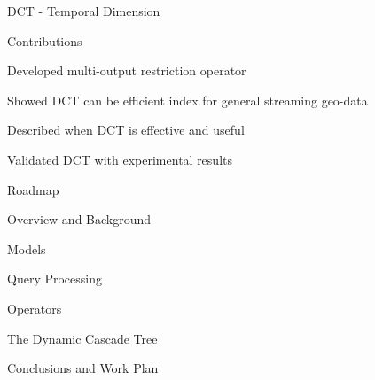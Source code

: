 \documentclass[final,total,bgColor,slideColor,pdf,ps2pdf,default,noaccumulate]{prosper}
\begin{document}
\begin{slide}{DCT - Temporal Dimension}
  \centering
  \scalebox{0.8}{}
\end{slide}

\begin{slide}{Contributions}
  \begin{Itemize}
  \item Developed multi-output restriction operator    
  \item Showed DCT can be efficient index for general streaming geo-data
  \item Described when DCT is effective and useful
  \item Validated DCT with experimental results
  \end{Itemize}
\end{slide}

\begin{slide}{Roadmap}
  \begin{Itemize}
    {\tiny
    \item Overview and Background
    \item Models
    \item Query Processing
    \item Operators
    \item The Dynamic Cascade Tree
      }
  {\blue \item Conclusions and Work Plan}
  \end{Itemize}
\end{slide}
\end{document}
